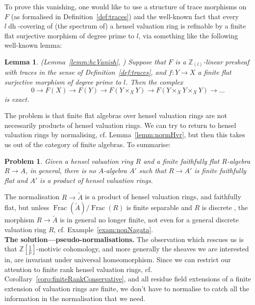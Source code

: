 \documentclass[10pt]{amsart}
\newtheorem{lemm}[theo]{Lemma}
\newtheorem*{prob}{Problem}
\theoremstyle{definition}
\newcommand{\zpi}{\mathbb{Z}[\tfrac{1}{p}]}
\newcommand{\zll}{\mathbb{Z}_{(l)}}
\DeclareMathOperator{\Frac}{Frac}
\newcommand{\ldh}{{l{\operatorname{dh}}}}
\begin{document}
To prove this vanishing, one would like to use a structure of trace morphisms on $F$ (as formalised in Definition~\ref{def:traces}) and the well-known fact that every $\ldh$-covering of (the spectrum of) a hensel valuation ring is refinable by a finite flat surjective morphism of degree prime to $l$, via something like the following well-known lemma:

\begin{lemm}{(Lemma~\ref{lemm:hcVanish}, {\cite[Lemma 2.1.8]{Kel17}})} \label{lemm:hcVanishIntro}
Suppose that $F$ is a $\zll$-linear presheaf with traces in the sense of Definition~\ref{def:traces}, and $f: Y \to X$ a finite flat surjective morphism of degree prime to $l$. Then the complex
\[ 0 \to F(X) \to F(Y) \to F(Y \times_{X} Y) \to F(Y \times_{X} Y \times_{X} Y) \to \dots \]
is exact. 
\end{lemm}

The problem is that finite flat algebras over hensel valuation rings are not necessarily products of hensel valuation rings. We can try to return to hensel valuation rings by normalising, cf. Lemma~\ref{lemm:normHvr}, but then this takes us out of the category of finite algebras. To summarise: 

\begin{prob}
Given a hensel valuation ring $R$ and a finite faithfully flat $R$-algebra $R \to A$, in general, there is no $A$-algebra $A'$ such that $R \to A'$ is finite faithfully flat and $A'$ is a product of hensel valuation rings.
\end{prob}

The normalisation $R \to \widetilde{A}$ is a product of hensel valuation rings, and faithfully flat, but unless $\Frac(\widetilde{A}) / \Frac(R)$ is finite separable and $R$ is discrete \cite[Chap.6,Sec.8,No.5,Thm.2,Cor.1]{Bou64}, the morphism $R \to \widetilde{A}$ is in general no longer finite, not even for a general discrete valuation ring $R$, cf. Example~\ref{exam:nonNagata}. \\


\textbf{The solution---pseudo-normalisations.} The observation which rescues us is that $\zpi$-motivic cohomology, and more generally the sheaves we are interested in, are invariant under universal homeomorphism. Since we can restrict our attention to finite rank hensel valuation rings, cf. Corollary~\ref{coro:finiteRankConservative}, and all residue field extensions of a finite extension of valuation rings are finite, we don't have to normalise to catch all the information in the normalisation that we need. 
\end{document}
